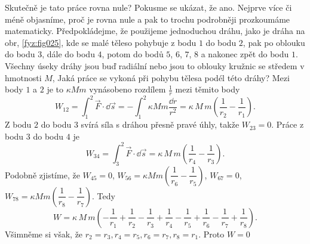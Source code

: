 {    Skutečně je tato práce rovna nule? Pokusme se ukázat, že ano. Nejprve více či méně objasníme, 
    proč je rovna nule a pak to trochu podrobněji prozkoumáme matematicky. Předpokládejme, že 
    použijeme jednoduchou dráhu, jako je dráha na obr, \ref{fyz:fig025}, kde se malé těleso 
    pohybuje z bodu \(1\) do bodu \(2\), pak po oblouku do bodu \(3\), dále do bodu \(4\), potom do 
    bodů \(5\), \(6\), \(7\), \(8\)  a nakonec zpět do bodu \(1\). Všechny úseky dráhy jsou buď 
    radiální nebo jsou to oblouky kružnic se středem v hmotnosti \(M\), Jaká práce se vykoná při 
    pohybu tělesa podél této dráhy? Mezi body \(1\) a \(2\) je to \(\kappa Mm\) vynásobeno rozdílem 
    \(\frac{1}{r}\) mezi těmito body
    \begin{equation*}
      W_{12} = \int_{1}^{2}\vec{F}\cdot\dd{\vec{s}} = 
             - \int_{1}^{2}\kappa Mm\frac{\dd{r}}{r^2}
             = \kappa\,M\,m\left(\dfrac{1}{r_2} - \dfrac{1}{r_1}\right).
    \end{equation*} 
    Z bodu \(2\) do bodu \(3\) svírá síla s dráhou přesně pravé úhly, takže \(W_{23} = 0\). Práce z 
    bodu \(3\) do bodu \(4\) je
    \begin{equation*}
      W_{34} = \int_{3}^{2}\vec{F}\cdot\dd{\vec{s}}
             = \kappa\,M\,m\left(\dfrac{1}{r_4} - \dfrac{1}{r_3}\right).
    \end{equation*} 
    Podobně zjistíme, že \(W_{45} = 0\), \(W_{56} = \kappa Mm\left(\dfrac{1}{r_6} - 
    \dfrac{1}{r_5}\right)\), \(W_{67}=0\), \(W_{78} = \kappa Mm\left(\dfrac{1}{r_8} - 
    \dfrac{1}{r_7}\right)\). Tedy
    \begin{equation*}
      W = \kappa\,M\,m\left(-\dfrac{1}{r_1} + \dfrac{1}{r_2} 
                            -\dfrac{1}{r_3} + \dfrac{1}{r_4}
                            -\dfrac{1}{r_5} + \dfrac{1}{r_6}
                            -\dfrac{1}{r_7} + \dfrac{1}{r_8}\right).
    \end{equation*} 
    Všimněme si však, že \(r_2 = r_3, r_4 = r_5, r_6 = r_7, r_8 = r_1\). Proto \(W = 0\)
    
}
